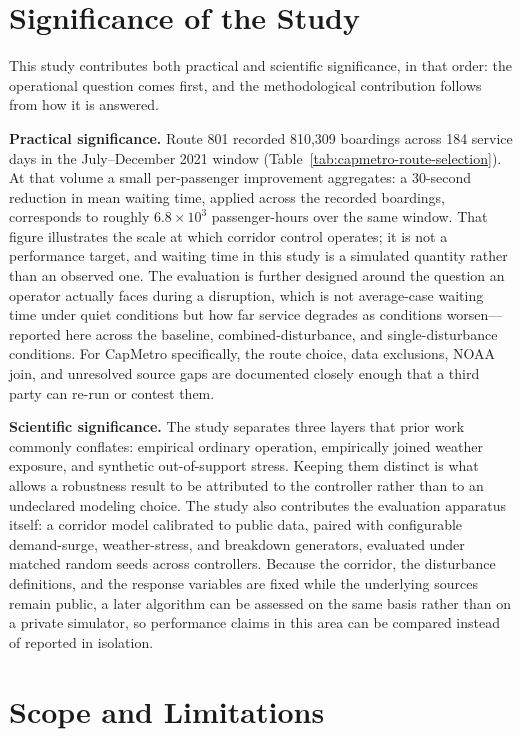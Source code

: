 \section{Significance of the Study}

This study contributes both practical and scientific significance, in that order: the operational question comes first, and the methodological contribution follows from how it is answered.

\textbf{Practical significance.} Route 801 recorded 810{,}309 boardings across 184 service days in the July--December 2021 window (Table~\ref{tab:capmetro-route-selection}). At that volume a small per-passenger improvement aggregates: a 30-second reduction in mean waiting time, applied across the recorded boardings, corresponds to roughly $6.8\times10^{3}$ passenger-hours over the same window. That figure illustrates the scale at which corridor control operates; it is not a performance target, and waiting time in this study is a simulated quantity rather than an observed one. The evaluation is further designed around the question an operator actually faces during a disruption, which is not average-case waiting time under quiet conditions but how far service degrades as conditions worsen---reported here across the baseline, combined-disturbance, and single-disturbance conditions. For CapMetro specifically, the route choice, data exclusions, NOAA join, and unresolved source gaps are documented closely enough that a third party can re-run or contest them.

\textbf{Scientific significance.} The study separates three layers that prior work commonly conflates: empirical ordinary operation, empirically joined weather exposure, and synthetic out-of-support stress. Keeping them distinct is what allows a robustness result to be attributed to the controller rather than to an undeclared modeling choice. The study also contributes the evaluation apparatus itself: a corridor model calibrated to public data, paired with configurable demand-surge, weather-stress, and breakdown generators, evaluated under matched random seeds across controllers. Because the corridor, the disturbance definitions, and the response variables are fixed while the underlying sources remain public, a later algorithm can be assessed on the same basis rather than on a private simulator, so performance claims in this area can be compared instead of reported in isolation.

\section{Scope and Limitations}\label{sec:scope}

